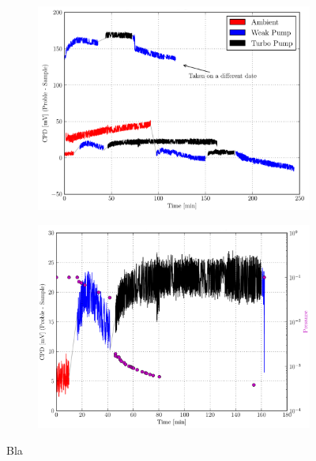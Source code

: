 \begin{figure}
\begin{subfigure}{0.5\textwidth}
\centering
	\includegraphics[width=0.95\linewidth]{./figs/HOPGMcA}
	\caption{}
	\label{fig:hopg-p1}
\end{subfigure}
\begin{subfigure}{0.5\textwidth}
\centering
	\includegraphics[width=0.95\linewidth]{./figs/HOPGMcAPres}
	\caption{}
	\label{fig:hopg-p2}
\end{subfigure}
\caption{Bla}
\end{figure}
\label{fig:hopg-p}
